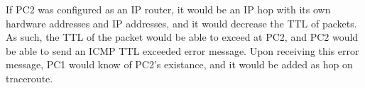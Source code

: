 If PC2 was configured as an IP router, it would be an IP hop with its own hardware
addresses and IP addresses, and it would decrease the TTL of packets. As such, the
TTL of the packet would be able to exceed at PC2, and PC2 would be able to send an
ICMP TTL exceeded error message. Upon receiving this error message, PC1 would know
of PC2's existance, and it would be added as hop on traceroute.
